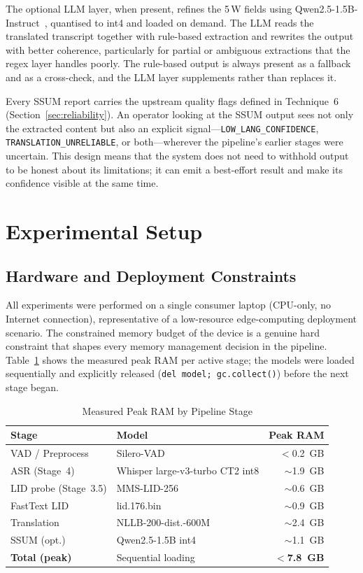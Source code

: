 \documentclass[12pt, onecolumn]{IEEEtran}
\begin{document}
The optional LLM layer, when present, refines the 5\,W fields using Qwen2.5-1.5B-Instruct~\cite{qwen2025}, quantised to int4 and loaded on demand. The LLM reads the translated transcript together with rule-based extraction and rewrites the output with better coherence, particularly for partial or ambiguous extractions that the regex layer handles poorly. The rule-based output is always present as a fallback and as a cross-check, and the LLM layer supplements rather than replaces it.

Every SSUM report carries the upstream quality flags defined in Technique~6 (Section~\ref{sec:reliability}). An operator looking at the SSUM output sees not only the extracted content but also an explicit signal---\texttt{LOW\_LANG\_CONFIDENCE}, \texttt{TRANSLATION\_UNRELIABLE}, or both---wherever the pipeline's earlier stages were uncertain. This design means that the system does not need to withhold output to be honest about its limitations; it can emit a best-effort result and make its confidence visible at the same time.

\section{Experimental Setup}

\subsection{Hardware and Deployment Constraints}

All experiments were performed on a single consumer laptop (CPU-only, no Internet connection), representative of a low-resource edge-computing deployment scenario. The constrained memory budget of the device is a genuine hard constraint that shapes every memory management decision in the pipeline. Table~\ref{tab:memory} shows the measured peak RAM per active stage; the models were loaded sequentially and explicitly released (\texttt{del model; gc.collect()}) before the next stage began.

\begin{table}[htbp]
\caption{Measured Peak RAM by Pipeline Stage}
\label{tab:memory}
\begin{center}
\begin{tabular}{p{2.4cm}p{3.2cm}r}
\toprule
\textbf{Stage} & \textbf{Model} & \textbf{Peak RAM} \\
\midrule
VAD / Preprocess & Silero-VAD & $<$0.2~GB \\
ASR (Stage~4) & Whisper large-v3-turbo CT2 int8 & $\sim$1.9~GB \\
LID probe (Stage~3.5) & MMS-LID-256 & $\sim$0.6~GB \\
FastText LID & lid.176.bin & $\sim$0.9~GB \\
Translation & NLLB-200-dist.-600M & $\sim$2.4~GB \\
SSUM (opt.) & Qwen2.5-1.5B int4 & $\sim$1.1~GB \\
\midrule
\textbf{Total (peak)} & Sequential loading & \textbf{$<$7.8~GB} \\
\bottomrule
\end{tabular}
\end{center}
\end{table}
\end{document}

